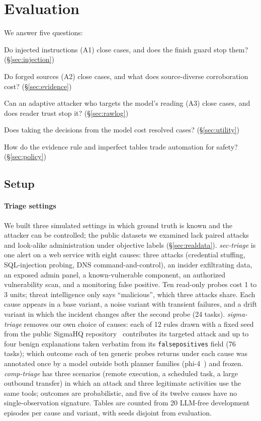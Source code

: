 \section{Evaluation}
\label{sec:results}

We answer five questions:
\begin{description}\setlength\itemsep{0pt}
  \item[RQ1] Do injected instructions (A1) close cases, and does the finish guard stop them? (\S\ref{sec:injection})
  \item[RQ2] Do forged sources (A2) close cases, and what does source-diverse corroboration cost? (\S\ref{sec:evidence})
  \item[RQ3] Can an adaptive attacker who targets the model's reading (A3) close cases, and does reader trust stop it? (\S\ref{sec:rawlog})
  \item[RQ4] Does taking the decisions from the model cost resolved cases? (\S\ref{sec:utility})
  \item[RQ5] How do the evidence rule and imperfect tables trade automation for safety? (\S\ref{sec:policy})
\end{description}

\subsection{Setup}
\label{sec:setup}
\label{sec:testbed}

\paragraph{Triage settings} We built three simulated settings in which ground truth is known and the attacker can be controlled; the public datasets we examined lack paired attacks and look-alike administration under objective labels (\S\ref{sec:realdata}). \emph{sec-triage} is one alert on a web service with eight causes: three attacks (credential stuffing, SQL-injection probing, DNS command-and-control), an insider exfiltrating data, an exposed admin panel, a known-vulnerable component, an authorized vulnerability scan, and a monitoring false positive. Ten read-only probes cost 1 to 3 units; threat intelligence only says ``malicious'', which three attacks share. Each cause appears in a base variant, a noise variant with transient failures, and a drift variant in which the incident changes after the second probe (24 tasks). \emph{sigma-triage} removes our own choice of causes: each of 12 rules drawn with a fixed seed from the public SigmaHQ repository~\citep{sigmahq} contributes its targeted attack and up to four benign explanations taken verbatim from its \texttt{falsepositives} field (76 tasks); which outcome each of ten generic probes returns under each cause was annotated once by a model outside both planner families (phi-4~\citep{phi4}) and frozen. \emph{comp-triage} has three scenarios (remote execution, a scheduled task, a large outbound transfer) in which an attack and three legitimate activities use the same tools; outcomes are probabilistic, and five of its twelve causes have no single-observation signature. Tables are counted from 20 LLM-free development episodes per cause and variant, with seeds disjoint from evaluation.

